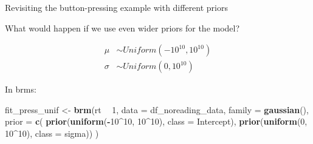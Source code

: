 \documentclass[12pt,ignorenonframetext,aspectratio=169]{beamer}
\newenvironment{Shaded}{\begin{snugshade}}{\end{snugshade}}
\newcommand{\DataTypeTok}[1]{\textcolor[rgb]{0.13,0.29,0.53}{#1}}
\newcommand{\DecValTok}[1]{\textcolor[rgb]{0.00,0.00,0.81}{#1}}
\newcommand{\KeywordTok}[1]{\textcolor[rgb]{0.13,0.29,0.53}{\textbf{#1}}}
\newcommand{\NormalTok}[1]{#1}
\newcommand{\OperatorTok}[1]{\textcolor[rgb]{0.81,0.36,0.00}{\textbf{#1}}}
\newcommand{\StringTok}[1]{\textcolor[rgb]{0.31,0.60,0.02}{#1}}
\begin{document}
\begin{frame}[fragile]{Revisiting the button-pressing example with different priors}
\protect\hypertarget{revisiting-the-button-pressing-example-with-different-priors}{}

What would happen if we use even wider priors for the model?

\begin{equation}
\begin{aligned}
\mu &\sim Uniform(-10^{10}, 10^{10}) \\
\sigma &\sim Uniform(0,  10^{10}) 
\end{aligned}
\label{eq:rtpriorsflat}
\end{equation}

\begin{block}{In brms:}

\small

\begin{Shaded}
\begin{Highlighting}[]
\NormalTok{fit_press_unif <-}\StringTok{ }\KeywordTok{brm}\NormalTok{(rt }\OperatorTok{~}\StringTok{ }\DecValTok{1}\NormalTok{,}
  \DataTypeTok{data =}\NormalTok{ df_noreading_data,}
  \DataTypeTok{family =} \KeywordTok{gaussian}\NormalTok{(),}
  \DataTypeTok{prior =} \KeywordTok{c}\NormalTok{(}
      \KeywordTok{prior}\NormalTok{(}\KeywordTok{uniform}\NormalTok{(}\OperatorTok{-}\DecValTok{10}\OperatorTok{^}\DecValTok{10}\NormalTok{, }\DecValTok{10}\OperatorTok{^}\DecValTok{10}\NormalTok{), }\DataTypeTok{class =}\NormalTok{ Intercept),}
    \KeywordTok{prior}\NormalTok{(}\KeywordTok{uniform}\NormalTok{(}\DecValTok{0}\NormalTok{, }\DecValTok{10}\OperatorTok{^}\DecValTok{10}\NormalTok{), }\DataTypeTok{class =}\NormalTok{ sigma))}
\NormalTok{)}
\end{Highlighting}
\end{Shaded}

\normalsize

\end{block}

\end{frame}
\end{document}
